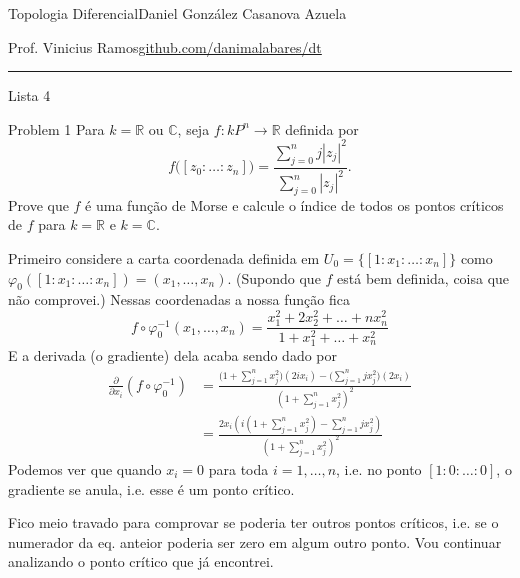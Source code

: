 
%




\begin{minipage}{\textwidth}
	\begin{minipage}{1\textwidth}
		Topologia Diferencial\hfill Daniel González Casanova Azuela
		
		{Prof. Vinicius Ramos\hfill\href{https://github.com/danimalabares/dt}{github.com/danimalabares/dt}}
	\end{minipage}
\end{minipage}\vspace{.2cm}\hrule

\vspace{10pt}
{\huge Lista 4}

\vspace{1em}

\begin{thing1}{Problem 1}\label{prob:1}\leavevmode
Para \(k=\mathbb{R}\) ou \(\mathbb{C}\), seja \(f: kP^n \longrightarrow \mathbb{R}\) definida por
\[f\Big([z_0:\ldots:z_n]\Big)=\frac{\sum_{j=0}^nj|z_j|^2}{\sum_{j=0}^n |z_j|^2}.\]
Prove que \(f\) é uma função de Morse e calcule o índice de todos os pontos críticos de \(f\) para  \(k=\mathbb{R}\) e \(k=\mathbb{C}\).
\end{thing1}

	 \iffalse Primeiro considere a carta coordenada definida em \(U_0=\{[1:x_1:\ldots:x_n]\}\) como \(\varphi_0([1:x_1:\ldots:x_n])=(x_1,\ldots,x_n)\). (Supondo que \(f\) está bem definida, coisa que não comprovei.) Nessas coordenadas a nossa função fica
	\[f \circ \varphi_0^{-1}(x_1,\ldots,x_n)=\frac{x_1^2+2x_2^2+\ldots+nx_n^2}{1+x_1^2+\ldots+x_n^2}\]
E a derivada (o gradiente) dela acaba sendo dado por
\begin{align*}\frac{\partial }{\partial x_i}(f \circ \varphi_0^{-1})&=\frac{\Big(1+\sum_{j=1}^n x_j^2\Big)(2ix_i)-\Big(\sum_{j=1}^njx_j^2\Big)(2x_i)}{\left(1+\sum_{j=1}^nx_j^2\right)^2 }\\
	&=\frac{2x_i\left(i \left(1+\sum_{j=1}^nx_j^2\right)-\sum_{j=1}^njx_j^2\right) }{\left(1+\sum_{j=1}^nx_j^2\right) ^2}
	\end{align*}
	Podemos ver que quando \(x_i=0\) para toda \(i=1,\ldots,n\), i.e. no ponto \([1:0:\ldots:0]\), o gradiente se anula, i.e. esse é um ponto crítico.

\begin{remark}\leavevmode
Fico meio travado para comprovar se poderia ter outros pontos críticos, i.e. se o numerador da eq. anteior poderia ser zero em algum outro ponto. Vou continuar analizando o ponto crítico que já encontrei.
\end{remark}

